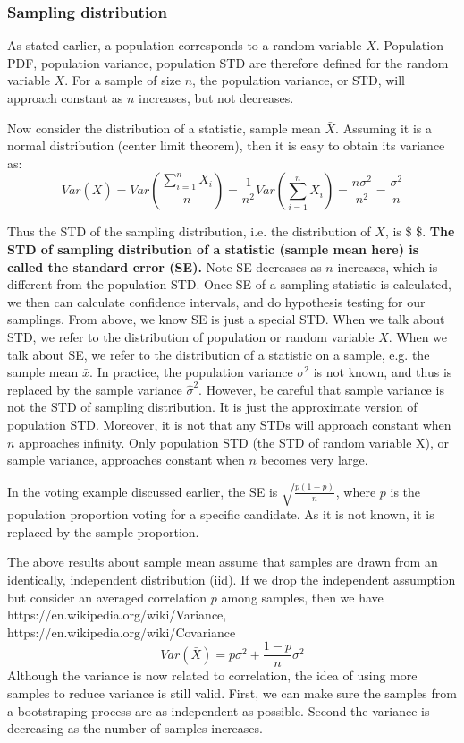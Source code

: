 \documentclass[11pt]{article}
\begin{document}
\subsubsection{Sampling distribution}\label{sampling-distribution}

As stated earlier, a population corresponds to a random variable \(X\).
Population PDF, population variance, population STD are therefore
defined for the random variable \(X\). For a sample of size \(n\), the
population variance, or STD, will approach constant as \(n\) increases,
but not decreases.

Now consider the distribution of a statistic, sample mean \(\bar{X}\).
Assuming it is a normal distribution (center limit theorem), then it is
easy to obtain its variance as:
\[Var(\bar{X}) = Var(\frac{\sum_{i=1}^n X_i}{n}) = \frac{1}{n^2} Var(\sum_{i=1}^n X_i) = \frac{n \sigma^2}{n^2} = \frac{\sigma^2}{n}\]

Thus the STD of the sampling distribution, i.e. the distribution of
\(\bar{X}\), is \$ \$. \textbf{The STD of
sampling distribution of a statistic (sample mean here) is called the
standard error (SE).} Note SE decreases as \(n\) increases, which is
different from the population STD. Once SE of a sampling statistic is
calculated, we then can calculate confidence intervals, and do
hypothesis testing for our samplings. From above, we know SE is just a
special STD. When we talk about STD, we refer to the distribution of
population or random variable \(X\). When we talk about SE, we refer to
the distribution of a statistic on a sample, e.g. the sample mean
\(\bar{x}\). In practice, the population variance \(\sigma^2\) is not
known, and thus is replaced by the sample variance \(\hat{\sigma}^2\).
However, be careful that sample variance is not the STD of sampling
distribution. It is just the approximate version of population STD.
Moreover, it is not that any STDs will approach constant when \(n\)
approaches infinity. Only population STD (the STD of random variable X),
or sample variance, approaches constant when \(n\) becomes very large.

In the voting example discussed earlier, the SE is
\(\sqrt{\frac{p(1-p)}{n}}\), where \(p\) is the population proportion
voting for a specific candidate. As it is not known, it is replaced by
the sample proportion.

The above results about sample mean assume that samples are drawn from
an identically, independent distribution (iid). If we drop the
independent assumption but consider an averaged correlation \(p\) among
samples, then we have https://en.wikipedia.org/wiki/Variance,
https://en.wikipedia.org/wiki/Covariance
\[ Var(\bar X) = p\sigma^2 + \frac{1-p}{n}\sigma^2\] Although the
variance is now related to correlation, the idea of using more samples
to reduce variance is still valid. First, we can make sure the samples
from a bootstraping process are as independent as possible. Second the
variance is decreasing as the number of samples increases.
\end{document}
